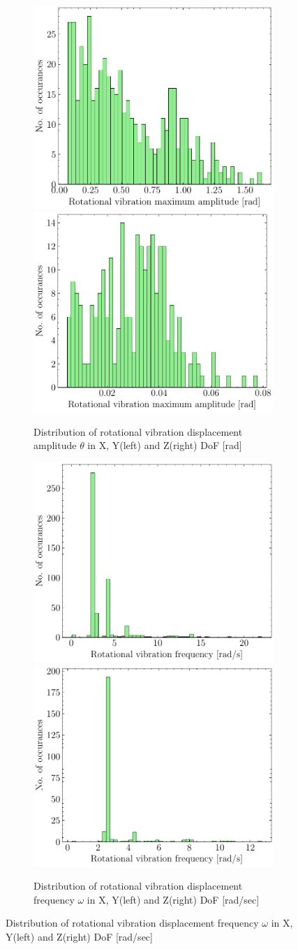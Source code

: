 \begin{figure}[H]
    \begin{subfigure}{\linewidth}
    \includegraphics[width=.5\linewidth]{images/fig_chapter4/data_dist/7.pdf}\hfill
    \includegraphics[width=.5\linewidth]{images/fig_chapter4/data_dist/8.pdf}
    \caption{Distribution of rotational vibration displacement amplitude $ \theta $ in X, Y(left) and Z(right) DoF [rad]}
    \end{subfigure}\par\medskip
    
    \begin{subfigure}{\linewidth}
    \includegraphics[width=.5\linewidth]{images/fig_chapter4/data_dist/9.pdf}\hfill
    \includegraphics[width=.5\linewidth]{images/fig_chapter4/data_dist/10.pdf}
    \caption{Distribution of rotational vibration displacement frequency $ \omega $ in X, Y(left) and Z(right) DoF [rad/sec]}
    \end{subfigure}\par\medskip
    

\end{figure}
